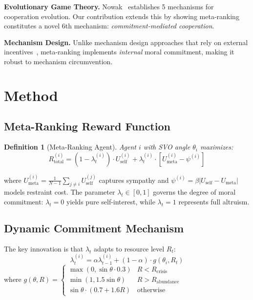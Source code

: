 \documentclass{article}
\newtheorem{definition}{Definition}
\begin{document}
\textbf{Evolutionary Game Theory.}
Nowak~\cite{nowak2006evolutionary} establishes 5 mechanisms for cooperation evolution.
Our contribution extends this by showing meta-ranking constitutes a novel 6th mechanism: \textit{commitment-mediated cooperation}.

\textbf{Mechanism Design.}
Unlike mechanism design approaches that rely on external incentives~\cite{hurwicz1973design}, meta-ranking implements \textit{internal} moral commitment, making it robust to mechanism circumvention.

\section{Method}

\subsection{Meta-Ranking Reward Function}

\begin{definition}[Meta-Ranking Agent]
Agent $i$ with SVO angle $\theta_i$ maximizes:
\begin{equation}
R_{\text{total}}^{(i)} = (1 - \lambda_t^{(i)}) \cdot U_{\text{self}}^{(i)}
  + \lambda_t^{(i)} \cdot \left[ U_{\text{meta}}^{(i)} - \psi^{(i)} \right]
\label{eq:reward}
\end{equation}
\end{definition}

\noindent where $U_{\text{meta}}^{(i)} = \frac{1}{N-1}\sum_{j \neq i} U_{\text{self}}^{(j)}$ captures sympathy and $\psi^{(i)} = \beta |U_{\text{self}} - U_{\text{meta}}|$ models restraint cost. The parameter $\lambda_t \in [0,1]$ governs the degree of moral commitment: $\lambda_t = 0$ yields pure self-interest, while $\lambda_t = 1$ represents full altruism.

\subsection{Dynamic Commitment Mechanism}

The key innovation is that $\lambda_t$ adapts to resource level $R_t$:
\begin{equation}
\lambda_t^{(i)} = \alpha \lambda_{t-1}^{(i)} + (1-\alpha) \cdot g(\theta_i, R_t)
\label{eq:lambda}
\end{equation}
where $g(\theta, R) = \begin{cases}
\max(0, \sin\theta \cdot 0.3) & R < R_{\text{crisis}} \\
\min(1, 1.5\sin\theta) & R > R_{\text{abundance}} \\
\sin\theta \cdot (0.7 + 1.6R) & \text{otherwise}
\end{cases}$
\end{document}

